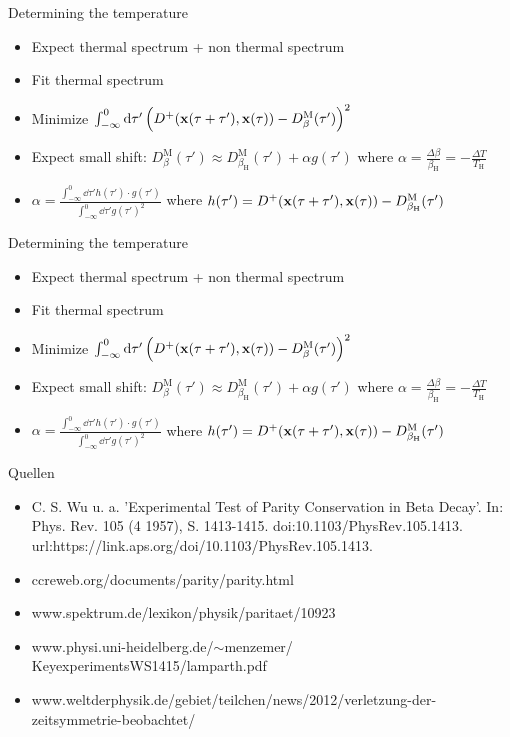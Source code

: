 \documentclass{beamer}
\let\todox\todo
\renewcommand\todo[1]{\todox[inline]{#1}}
\newcommand{\upd}[1]{^\mathrm{#1}}
\newcommand{\ind}[1]{_\mathrm{#1}}
\begin{document}
\begin{frame}{Determining the temperature}
\todo{image}
\begin{itemize}
	\item Expect thermal spectrum + non thermal spectrum
	\item Fit thermal spectrum
	\item Minimize \(\int_{-\infty}^0 \dd{\tau'} \qty(D^+(\vb{x}(\tau + \tau'), \vb{x}(\tau)) - D_\beta\upd{M}(\tau'))^2\)
	\item Expect small shift: \(D_\beta\upd{M}(\tau') \approx D_{\beta\ind{H}}\upd{M}(\tau') + \alpha g(\tau')\) where \(\alpha = \frac{\Delta\beta}{\beta\ind{H}} = - \frac{\Delta T}{T\ind{H}}\)
	\item \(\alpha = \frac{\int_{-\infty}^0 \dd{\tau'} h(\tau')\cdot g(\tau')}{\int_{-\infty}^0 \dd{\tau'} g(\tau')^2}\) where \(h(\tau') = D^+(\vb{x}(\tau + \tau'), \vb{x}(\tau)) - D_{\beta\ind{H}}\upd{M}(\tau')\)
\end{itemize}
\end{frame}

\begin{frame}{Determining the temperature}
\todo{image}
\begin{itemize}
	\item Expect thermal spectrum + non thermal spectrum
	\item Fit thermal spectrum
	\item Minimize \(\int_{-\infty}^0 \dd{\tau'} \qty(D^+(\vb{x}(\tau + \tau'), \vb{x}(\tau)) - D_\beta\upd{M}(\tau'))^2\)
	\item Expect small shift: \(D_\beta\upd{M}(\tau') \approx D_{\beta\ind{H}}\upd{M}(\tau') + \alpha g(\tau')\) where \(\alpha = \frac{\Delta\beta}{\beta\ind{H}} = - \frac{\Delta T}{T\ind{H}}\)
	\item \(\alpha = \frac{\int_{-\infty}^0 \dd{\tau'} h(\tau')\cdot g(\tau')}{\int_{-\infty}^0 \dd{\tau'} g(\tau')^2}\) where \(h(\tau') = D^+(\vb{x}(\tau + \tau'), \vb{x}(\tau)) - D_{\beta\ind{H}}\upd{M}(\tau')\)
\end{itemize}
\end{frame}



\begin{frame}{Quellen}
\begin{itemize}
	\item C. S. Wu u. a. 'Experimental Test of Parity Conservation in Beta
Decay'. In: Phys. Rev. 105 (4 1957), S. 1413-1415. doi:10.1103/PhysRev.105.1413. url:https://link.aps.org/doi/10.1103/PhysRev.105.1413.
	\item ccreweb.org/documents/parity/parity.html
	\item www.spektrum.de/lexikon/physik/paritaet/10923
	\item www.physi.uni-heidelberg.de/$\sim$menzemer/ KeyexperimentsWS1415/lamparth.pdf
	\item www.weltderphysik.de/gebiet/teilchen/news/2012/verletzung-der-zeitsymmetrie-beobachtet/
\end{itemize}
\end{frame}

\begin{frame}
\maketitle
\end{frame}
\end{document}
